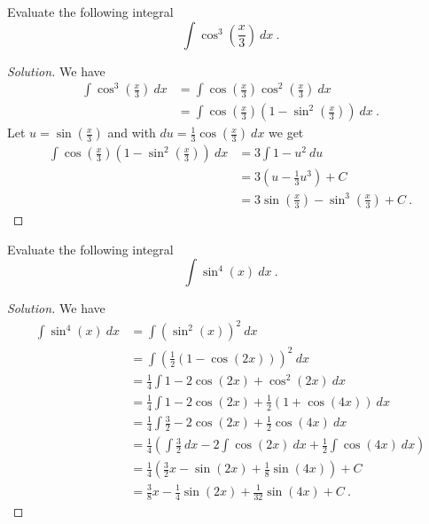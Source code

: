 \documentclass[compacto,10pt,comentarios]{aleph-notas}
\begin{document}
\begin{ejer}
    Evaluate the following integral
    $$
        \int \cos^{3} \left( \frac{x}{3} \right) ~ dx ~ .
    $$
\end{ejer}
\begin{proof}[Solution]
    We have
    \begin{align*}
        \int \cos^{3} \left( \frac{x}{3} \right) ~ dx
        & = \int \cos \left( \frac{x}{3} \right) \cos^{2} \left( \frac{x}{3} \right) ~ dx \\
        & = \int \cos \left( \frac{x}{3} \right) \left( 1 - \sin^{2} \left( \frac{x}{3} \right) \right) ~ dx ~ .
    \end{align*}
    Let $u = \sin(\frac{x}{3})$ and with $du = \frac{1}{3} \cos(\frac{x}{3}) ~ dx$ we get
    \begin{align*}
        \int \cos \left( \frac{x}{3} \right) \left( 1 - \sin^{2} \left( \frac{x}{3} \right) \right) ~ dx
        & = 3 \int  1 - u^{2} ~ du \\
        & = 3 \left( u - \frac{1}{3}u^{3} \right) + C \\
        & = 3 \sin\left(\frac{x}{3}\right) - \sin^{3}\left(\frac{x}{3}\right) + C ~ .
    \end{align*}
\end{proof}

\begin{ejer}
    Evaluate the following integral
    $$
        \int \sin^{4}(x) ~ dx ~ .
    $$
\end{ejer}
\begin{proof}[Solution]
    We have
    \begin{align*}
        \int \sin^{4}(x) ~ dx
        & = \int \left( \sin^{2}(x) \right)^{2} ~ dx \\
        & = \int \left( \frac{1}{2} \left( 1 - \cos(2x) \right) \right)^{2} ~ dx \\
        & = \frac{1}{4} \int 1 - 2 \cos(2x) + \cos^{2}(2x) ~ dx \\
        & = \frac{1}{4} \int 1 - 2 \cos(2x) + \frac{1}{2}(1+\cos(4x)) ~ dx \\ 
        & = \frac{1}{4} \int \frac{3}{2} - 2 \cos(2x) + \frac{1}{2}\cos(4x) ~ dx \\
        & = \frac{1}{4} \left( \int \frac{3}{2} ~ dx -2 \int \cos(2x) ~ dx + \frac{1}{2} \int \cos(4x) ~ dx \right) \\
        & = \frac{1}{4} \left( \frac{3}{2} x - \sin(2x) + \frac{1}{8} \sin(4x) \right) + C \\
        & = \frac{3}{8} x - \frac{1}{4} \sin(2x) + \frac{1}{32} \sin(4x) + C ~ .
    \end{align*}
\end{proof}
\end{document}
